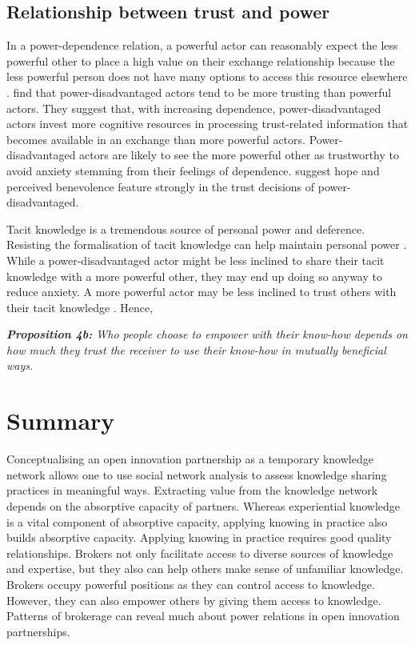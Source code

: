 \subsection{Relationship between trust and power}

In a power-dependence relation, a powerful actor can reasonably expect the less powerful other to place a high value on their exchange relationship because the less powerful person does not have many options to access this resource elsewhere \citep{emerson1962power}. \citet{schilke2015power} find that power-disadvantaged actors tend to be more trusting than powerful actors. They suggest that, with increasing dependence, power-disadvantaged actors invest more cognitive resources in processing trust-related information that becomes available in an exchange than more powerful actors. Power-disadvantaged actors are likely to see the more powerful other as trustworthy to avoid anxiety stemming from their feelings of dependence. \citet{schilke2015power} suggest hope and perceived benevolence feature strongly in the trust decisions of power-disadvantaged. \medskip

Tacit knowledge is a tremendous source of personal power and deference. Resisting the formalisation of tacit knowledge can help maintain personal power \citep{schultze2004knowing}. While a power-disadvantaged actor might be less inclined to share their tacit knowledge with a more powerful other, they may end up doing so anyway to reduce anxiety. A more powerful actor may be less inclined to trust others with their tacit knowledge \citep{schilke2015power}. Hence, \bigskip

\begin{tcolorbox}
\textit{\textbf{Proposition 4b:} Who people choose to empower with their know-how depends on how much they trust the receiver to use their know-how in mutually beneficial ways.} 
\end{tcolorbox}

\section{Summary}

Conceptualising an open innovation partnership as a temporary knowledge network allows one to use social network analysis to assess knowledge sharing practices in meaningful ways. Extracting value from the knowledge network depends on the absorptive capacity of partners. Whereas experiential knowledge is a vital component of absorptive capacity, applying knowing in practice also builds absorptive capacity. Applying knowing in practice requires good quality relationships. Brokers not only facilitate access to diverse sources of knowledge and expertise, but they also can help others make sense of unfamiliar knowledge. Brokers occupy powerful positions as they can control access to knowledge. However, they can also empower others by giving them access to knowledge. Patterns of brokerage can reveal much about power relations in open innovation partnerships. \medskip

